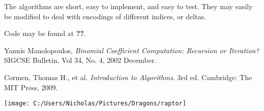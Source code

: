 \documentclass[preprint]{sigplanconf}
\begin{document}
	The algorithms are short, easy to implement, and easy to test. 
	They may easily be modified to deal with encodings of different indices, or deltas.	
	
	Code may be found at \textbf{??}.
	
	
	\begin{thebibliography}{9}
			Yannis Manolopoulos,
		  \emph{Binomial Coefficient Computation: Recursion or Iteration?}
		  SIGCSE Bulletin,
		  Vol 34, No. 4, 2002 December.
	
			Cormen, Thomas H., et al.
			\emph{Introduction to Algorithms}.
			3rd ed.
			Cambridge: The MIT Press, 2009.
	\end{thebibliography}
	
	
	\vspace{1cm}\begin{center}\texttt{[image: C:/Users/Nicholas/Pictures/Dragons/raptor]}\par\end{center}
	
	
	
%	
%	
%	
	
\end{document}
